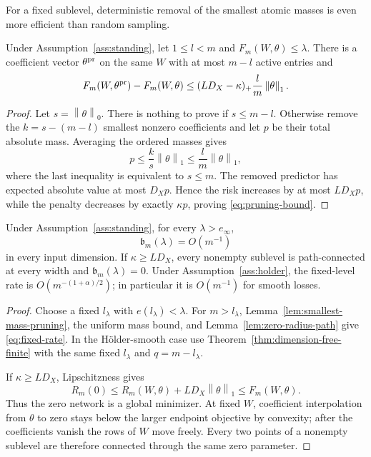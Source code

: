 \documentclass[smallextended,envcountsect]{svjour3}
\newcommand{\norm}[1]{\left\lVert #1 \right\rVert}
\newcommand{\SubBar}{\mathfrak b}
\begin{document}
For a fixed sublevel, deterministic removal of the smallest atomic masses is
even more efficient than random sampling.

\begin{lemma}\label{lem:smallest-mass-pruning}
Under Assumption~\ref{ass:standing}, let $1\le l<m$ and
$F_m(W,\theta)\le\lambda$.  There is a coefficient vector
$\theta^{\rm pr}$ on the same $W$ with at most $m-l$ active entries and
\begin{equation}
 F_m(W,\theta^{\rm pr})-F_m(W,\theta)
 \le (LD_X-\kappa)_+\frac lm\norm{\theta}_1.
 \label{eq:pruning-bound}
\end{equation}
\end{lemma}

\begin{proof}
Let $s=\norm{\theta}_0$.  There is nothing to prove if $s\le m-l$.
Otherwise remove the $k=s-(m-l)$ smallest nonzero coefficients and let $p$
be their total absolute mass.  Averaging the ordered masses gives
\[
 p\le\frac ks\norm{\theta}_1\le\frac lm\norm{\theta}_1,
\]
where the last inequality is equivalent to $s\le m$.  The removed predictor
has expected absolute value at most $D_Xp$.  Hence the risk increases by at
most $LD_Xp$, while the penalty decreases by exactly $\kappa p$, proving
\eqref{eq:pruning-bound}.
\end{proof}

\begin{theorem}\label{thm:fixed-level}
Under Assumption~\ref{ass:standing}, for every $\lambda>e_\infty$,
\begin{equation}
 \boxed{\SubBar_m(\lambda)=O(m^{-1})}
 \label{eq:fixed-rate}
\end{equation}
in every input dimension.  If $\kappa\ge LD_X$, every nonempty sublevel is
path-connected at every width and $\SubBar_m(\lambda)=0$.
Under Assumption~\ref{ass:holder}, the fixed-level rate is
$O(m^{-(1+\alpha)/2})$; in particular it is $O(m^{-1})$ for smooth losses.
\end{theorem}

\begin{proof}
Choose a fixed $l_\lambda$ with $e(l_\lambda)<\lambda$.  For
$m>l_\lambda$, Lemma~\ref{lem:smallest-mass-pruning}, the uniform mass bound,
and Lemma~\ref{lem:zero-radius-path} give \eqref{eq:fixed-rate}.  In the
H\"older-smooth case use Theorem~\ref{thm:dimension-free-finite} with the same
fixed $l_\lambda$ and $q=m-l_\lambda$.

If $\kappa\ge LD_X$, Lipschitzness gives
\[
 R_m(0)\le R_m(W,\theta)+LD_X\norm{\theta}_1\le F_m(W,\theta).
\]
Thus the zero network is a global minimizer.  At fixed $W$, coefficient
interpolation from $\theta$ to zero stays below the larger endpoint objective
by convexity; after the coefficients vanish the rows of $W$ move freely.
Every two points of a nonempty sublevel are therefore connected through the
same zero parameter.
\end{proof}
\end{document}
